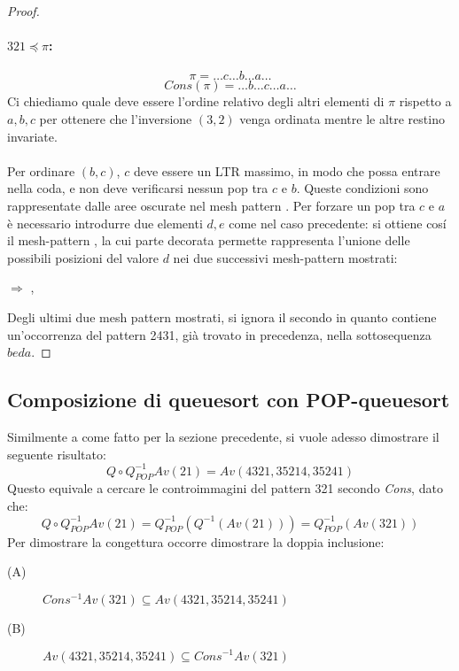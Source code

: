 \begin{proof}
\paragraph*{$321\preceq\pi$:}$$\pi=\dots c\dots b\dots a\dots$$$$Cons(\pi)=\dots b\dots c\dots a\dots$$
Ci chiediamo quale deve essere l'ordine relativo degli altri elementi di $\pi$ rispetto a $a,b,c$ per ottenere che l'inversione $(3,2)$ venga ordinata mentre le altre restino invariate.\\\\
Per ordinare $(b,c)$, $c$ deve essere un LTR massimo, in modo che possa entrare nella coda, e non deve verificarsi nessun pop tra $c$ e $b$. Queste condizioni sono rappresentate dalle aree oscurate nel mesh pattern . Per forzare un pop tra $c$ e $a$ \`e necessario introdurre due elementi $d,e$ come nel caso precedente: si ottiene cos\'i il mesh-pattern , la cui parte decorata permette rappresenta l'unione delle possibili posizioni del valore $d$ nei due successivi mesh-pattern mostrati:
\begin{center}
 $\Rightarrow$
,
\end{center}
Degli ultimi due mesh pattern mostrati, si ignora il secondo in quanto contiene un'occorrenza del pattern 2431, gi\`a trovato in precedenza, nella sottosequenza $beda$.
\end{proof}
\subsection{Composizione di queuesort con POP-queuesort}
Similmente a come fatto per la sezione precedente, si vuole adesso dimostrare il seguente risultato:
$$Q\circ Q_{POP}^{-1}Av(21) = Av(4321, 35214, 35241)$$
Questo equivale a cercare le controimmagini del pattern 321 secondo \textit{Cons}, dato che:
$$Q\circ Q_{POP}^{-1}Av(21) = Q_{POP}^{-1}(Q^{-1}(Av(21))) = Q_{POP}^{-1}(Av(321))$$
Per dimostrare la congettura occorre dimostrare la doppia inclusione:
\begin{description}
\item[(A)]$Cons^{-1}Av(321) \subseteq Av(4321, 35214, 35241)$
\item[(B)]$Av(4321, 35214, 35241) \subseteq Cons^{-1}Av(321)$
\end{description}

